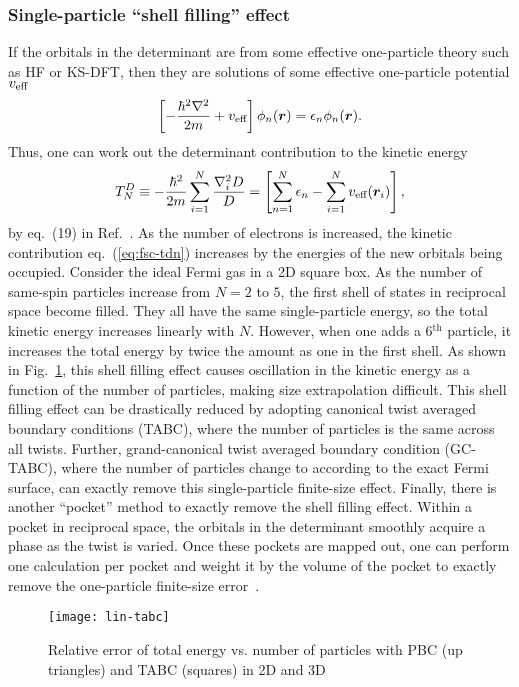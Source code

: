 \subsubsection{Single-particle ``shell filling'' effect}
If the orbitals in the determinant are from some effective one-particle theory such as HF or KS-DFT, then they are solutions of some effective one-particle potential $v_{\text{eff}}$
\begin{align}
\left[
-\dfrac{\hbar^2\nabla^2}{2m} + v_{\text{eff}}
\right] \phi_n(\boldsymbol{r}) = \epsilon_n\phi_n(\boldsymbol{r}).
\end{align}
Thus, one can work out the determinant contribution to the kinetic energy
\begin{align} \label{eq:fsc-tdn}
T^D_N \equiv -\dfrac{\hbar^2}{2m}\sum\limits_{i=1}^N \dfrac{\nabla_i^2D}{D} = \left[
\sum\limits_{n=1}^N\epsilon_n - \sum\limits_{i=1}^N v_{\text{eff}}(\boldsymbol{r}_i)
\right],
\end{align}
by eq.~(19) in Ref.~\cite{Holzmann2016}. As the number of electrons is increased, the kinetic contribution eq.~(\ref{eq:fsc-tdn}) increases by the energies of the new orbitals being occupied. Consider the ideal Fermi gas in a 2D square box. As the number of same-spin particles increase from $N=2$ to $5$, the first shell of states in reciprocal space become filled. They all have the same single-particle energy, so the total kinetic energy increases linearly with $N$. However, when one adds a 6$^{\text{th}}$ particle, it increases the total energy by twice the amount as one in the first shell. As shown in Fig.~\ref{fig:fsc-lin-tabc}, this shell filling effect causes oscillation in the kinetic energy as a function of the number of particles, making size extrapolation difficult. This shell filling effect can be drastically reduced by adopting canonical twist averaged boundary conditions (TABC), where the number of particles is the same across all twists. Further, grand-canonical twist averaged boundary condition (GC-TABC), where the number of particles change to according to the exact Fermi surface, can exactly remove this single-particle finite-size effect. Finally, there is another ``pocket'' method to exactly remove the shell filling effect. Within a pocket in reciprocal space, the orbitals in the determinant smoothly acquire a phase as the twist is varied. Once these pockets are mapped out, one can perform one calculation per pocket and weight it by the volume of the pocket to exactly remove the one-particle finite-size error~\cite{Holzmann2016}.

\begin{figure}[h]
\centering
\texttt{[image: lin-tabc]}
\caption{Relative error of total energy vs. number of particles with PBC (up triangles) and TABC (squares) in 2D and 3D~\cite{Lin2001}}
\label{fig:fsc-lin-tabc}
\end{figure}

